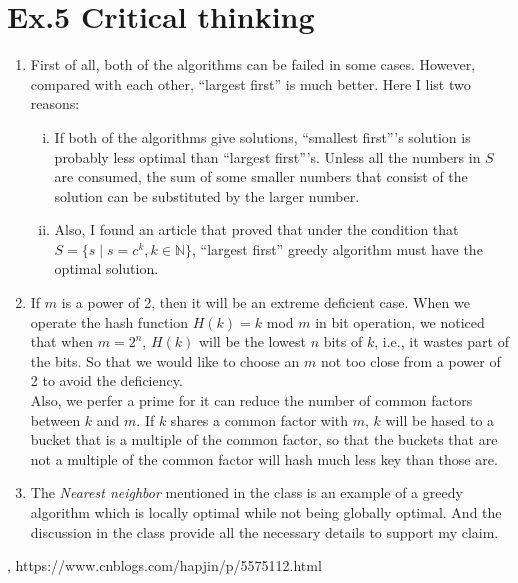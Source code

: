 \documentclass[a4paper]{article}
\begin{document}
\section*{Ex.5 Critical thinking}
	\begin{enumerate}[1.]
		\item First of all, both of the algorithms can be failed in some cases. However, compared with each other, ``largest first'' is much better. Here I list two reasons:
		\begin{enumerate}[i.]
			\item If both of the algorithms give solutions, ``smallest first'''s solution is probably less optimal than ``largest first'''s. Unless all the numbers in $S$ are consumed, the sum of some smaller numbers that consist of the solution can be substituted by the larger number.
			\item Also, I found an article that proved that under the condition that $S=\{s\mid s=c^k, k\in \mathbb{N}\}$, ``largest first'' greedy algorithm must have the optimal solution.
		\end{enumerate}
		\item If $m$ is a power of 2, then it will be an extreme deficient case. When we operate the hash function $H(k) = k$ mod $m$ in bit operation, we noticed that when $m=2^n$, $H(k)$ will be the lowest $n$ bits of $k$, i.e., it wastes part of the bits. So that we would like to choose an $m$ not too close from a power of 2 to avoid the deficiency.\\
		Also, we perfer a prime for it can reduce the number of common factors between $k$ and $m$. If $k$ shares a common factor with $m$, $k$ will be hased to a bucket that is a multiple of the common factor, so that the buckets that are not a multiple of the common factor will hash much less key than those are.
		\item The \textit{Nearest neighbor} mentioned in the class is an example of a greedy algorithm which is locally optimal while not being globally optimal. And the discussion in the class provide all the necessary details to support my claim.
	\end{enumerate}

\newpage
\begin{thebibliography}{99}
	, https://www.cnblogs.com/hapjin/p/5575112.html
\end{thebibliography}
\end{document}
